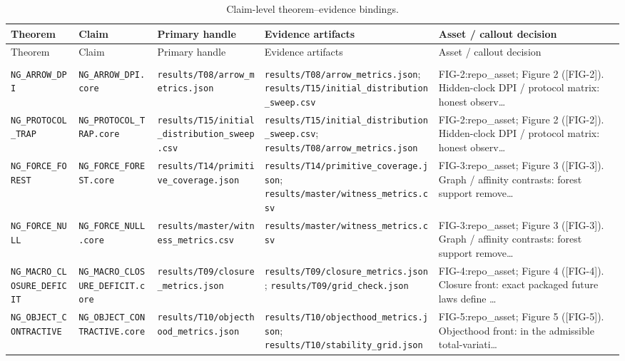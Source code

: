 {\footnotesize
\begin{longtable}{>{\raggedright\arraybackslash}p{} >{\raggedright\arraybackslash}p{} >{\raggedright\arraybackslash}p{} >{\raggedright\arraybackslash}p{} >{\raggedright\arraybackslash}p{}}
\caption{Claim-level theorem--evidence bindings.}\label{tab:evidence-map}\\
\toprule
Theorem & Claim & Primary handle & Evidence artifacts & Asset / callout decision\\
\midrule
\endfirsthead
\toprule
Theorem & Claim & Primary handle & Evidence artifacts & Asset / callout decision\\
\midrule
\endhead
\midrule
\multicolumn{5}{r}{Continued on next page}\\
\midrule
\endfoot
\bottomrule
\endlastfoot
\texttt{NG\_ARROW\_DPI} & \texttt{NG\_ARROW\_DPI.core} & \texttt{results/T08/arrow\_metrics.json} & \texttt{results/T08/arrow\_metrics.json}; \texttt{results/T15/initial\_distribution\_sweep.csv} & FIG-2:repo\_asset; Figure 2 ([FIG-2]). Hidden-clock DPI / protocol matrix: honest observ…\\
\texttt{NG\_PROTOCOL\_TRAP} & \texttt{NG\_PROTOCOL\_TRAP.core} & \texttt{results/T15/initial\_distribution\_sweep.csv} & \texttt{results/T15/initial\_distribution\_sweep.csv}; \texttt{results/T08/arrow\_metrics.json} & FIG-2:repo\_asset; Figure 2 ([FIG-2]). Hidden-clock DPI / protocol matrix: honest observ…\\
\texttt{NG\_FORCE\_FOREST} & \texttt{NG\_FORCE\_FOREST.core} & \texttt{results/T14/primitive\_coverage.json} & \texttt{results/T14/primitive\_coverage.json}; \texttt{results/master/witness\_metrics.csv} & FIG-3:repo\_asset; Figure 3 ([FIG-3]). Graph / affinity contrasts: forest support remove…\\
\texttt{NG\_FORCE\_NULL} & \texttt{NG\_FORCE\_NULL.core} & \texttt{results/master/witness\_metrics.csv} & \texttt{results/master/witness\_metrics.csv} & FIG-3:repo\_asset; Figure 3 ([FIG-3]). Graph / affinity contrasts: forest support remove…\\
\texttt{NG\_MACRO\_CLOSURE\_DEFICIT} & \texttt{NG\_MACRO\_CLOSURE\_DEFICIT.core} & \texttt{results/T09/closure\_metrics.json} & \texttt{results/T09/closure\_metrics.json}; \texttt{results/T09/grid\_check.json} & FIG-4:repo\_asset; Figure 4 ([FIG-4]). Closure front: exact packaged future laws define …\\
\texttt{NG\_OBJECT\_CONTRACTIVE} & \texttt{NG\_OBJECT\_CONTRACTIVE.core} & \texttt{results/T10/objecthood\_metrics.json} & \texttt{results/T10/objecthood\_metrics.json}; \texttt{results/T10/stability\_grid.json} & FIG-5:repo\_asset; Figure 5 ([FIG-5]). Objecthood front: in the admissible total-variati…\\

\end{longtable}}
